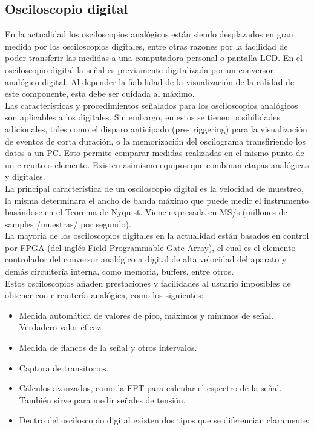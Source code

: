 \documentclass[a4paper,12pt]{report}
\begin{document}
\subsection{Osciloscopio digital}
En la actualidad los osciloscopios analógicos están siendo desplazados en gran medida por los osciloscopios digitales, entre otras razones por la facilidad de poder transferir las medidas a una computadora personal o pantalla LCD. En el osciloscopio digital la señal es previamente digitalizada por un conversor analógico digital. Al depender la fiabilidad de la visualización de la calidad de este componente, esta debe ser cuidada al máximo.\\
Las características y procedimientos señalados para los osciloscopios analógicos son aplicables a los digitales. Sin embargo, en estos se tienen posibilidades adicionales, tales como el disparo anticipado (pre-triggering) para la visualización de eventos de corta duración, o la memorización del oscilograma transfiriendo los datos a un PC. Esto permite comparar medidas realizadas en el mismo punto de un circuito o elemento. Existen asimismo equipos que combinan etapas analógicas y digitales.\\
La principal característica de un osciloscopio digital es la velocidad de muestreo, la misma determinara el ancho de banda máximo que puede medir el instrumento basándose en el Teorema de Nyquist. Viene expresada en MS/s (millones de samples /muestras/ por segundo).\\
La mayoría de los osciloscopios digitales en la actualidad están basados en control por FPGA (del inglés Field Programmable Gate Array), el cual es el elemento controlador del conversor analógico a digital de alta velocidad del aparato y demás circuitería interna, como memoria, buffers, entre otros.\\
Estos osciloscopios añaden prestaciones y facilidades al usuario imposibles de obtener con circuitería analógica, como los siguientes:
\begin{itemize}
\item Medida automática de valores de pico, máximos y mínimos de señal. Verdadero valor eficaz.
\item Medida de flancos de la señal y otros intervalos.
\item Captura de transitorios.
\item Cálculos avanzados, como la FFT para calcular el espectro de la señal. También sirve para medir señales de tensión.
\item Dentro del osciloscopio digital existen dos tipos que se diferencian claramente:
\end{itemize}
\end{document}
